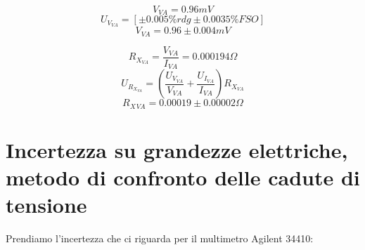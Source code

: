 \documentclass[a4paper]{article}
\begin{document}
\begin{Large}
	\begin{equation}
		V_{VA}= 0.96 mV
	\end{equation}
	\begin{equation}
		U_{V_{VA}} = [\pm 0.005\%rdg \pm 0.0035\% FSO]
	 \end{equation}
	 \begin{equation}
		V_{VA} = 0.96 \pm 0.004 mV
	 \end{equation}
\end{Large}

\begin{Large}
	\begin{equation}
		R_{X_{VA}}= \frac{V_{VA}}{I_{VA}} =0.000194 \Omega
	\end{equation}
	\begin{equation}
		U_{R_{X_{VA}}} = (\frac{U_{V_{VA}}}{V_{VA}}+\frac{U_{I_{VA}}}{I_{VA}})R_{X_{VA}}
	 \end{equation}
	 \begin{equation}
		R_X{_{VA}} = 0.00019\pm 0.00002\Omega
	 \end{equation}
\end{Large}

\section {Incertezza su grandezze elettriche, metodo di confronto delle cadute di tensione}

Prendiamo l'incertezza che ci riguarda per il multimetro Agilent 34410:
\end{document}
